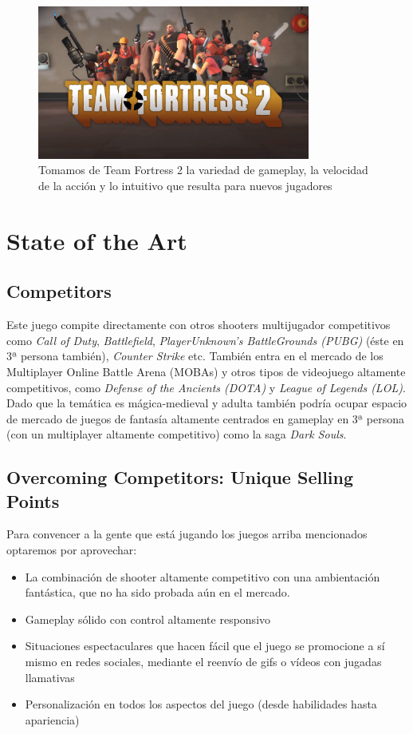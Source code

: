 \documentclass[12pt]{report}
\begin{document}
\begin{figure}[h]
    \centering
    \includegraphics[width=0.8\textwidth]{tf2}
	\captionsetup{labelformat=empty}
    \caption{Tomamos de Team Fortress 2 la variedad de gameplay, la velocidad de la acción y lo intuitivo que resulta para nuevos jugadores}
\end{figure}

\section{State of the Art}

\subsection{Competitors}
Este juego compite directamente con otros shooters multijugador competitivos como \textit{Call of Duty}, \textit{Battlefield}, \textit{PlayerUnknown's BattleGrounds (PUBG)} (éste en 3ª persona también), \textit{Counter Strike} etc. También entra en el mercado de los Multiplayer Online Battle Arena (MOBAs) y otros tipos de videojuego altamente competitivos, como \textit{Defense of the Ancients (DOTA)} y \textit{League of Legends (LOL)}. Dado que la temática es mágica-medieval y adulta también podría ocupar espacio de mercado de juegos de fantasía altamente centrados en gameplay en 3ª persona (con un multiplayer altamente competitivo) como la saga \textit{Dark Souls}.

\subsection{Overcoming Competitors: Unique Selling Points}
Para convencer a la gente que está jugando los juegos arriba mencionados optaremos por aprovechar:

\begin{itemize}
\item La combinación de shooter altamente competitivo con una ambientación fantástica, que no ha sido probada aún en el mercado.
\item Gameplay sólido con control altamente responsivo
\item Situaciones espectaculares que hacen fácil que el juego se promocione a sí mismo en redes sociales, mediante el reenvío de gifs o vídeos con jugadas llamativas
\item Personalización en todos los aspectos del juego (desde habilidades hasta apariencia)
\end{itemize}
\end{document}
